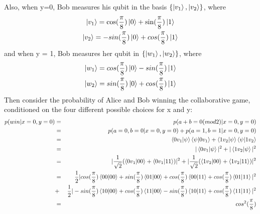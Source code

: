Also, when y=0, Bob measures his qubit in the basis $\{\ket{v_1}, \ket{v_2}\}$, where
\begin{gather*}
    \ket{v_1}=\cos(\frac{\pi}{8})\ket{0}+\sin(\frac{\pi}{8})\ket{1}\\
    \ket{v_2}=-sin(\frac{\pi}{8})\ket{0}+cos(\frac{\pi}{8})\ket{1}  
\end{gather*}
and when y = 1, Bob measures her qubit in $\{\ket{w_1}, \ket{w_2}\}$, where
\begin{gather*}
    \ket{w_1}=cos(\frac{\pi}{8})\ket{0}-sin(\frac{\pi}{8})\ket{1}\\
    \ket{w_2}=sin(\frac{\pi}{8})\ket{0}+cos(\frac{\pi}{8})\ket{1}
    \end{gather*}
Then consider the probability of Alice and Bob winning the collaborative game, conditioned on the four different possible choices for x and y:
\begin{eqnarray*}
p(win|x=0,y=0)&=&p(a+b=0(mod 2)|x=0,y=0)\\
&=&p(a=0, b=0|x=0, y=0)+p(a=1, b=1|x=0, y=0)\\
&=&\braket{0 v_1|\psi}\braket{\psi|0v_1}+\braket{1 v_2|\psi}\braket{\psi|1v_2}\\
&=&|\braket{0 v_1|\psi}|^2 + |\braket{1 v_2|\psi}|^2\\
&=&|\frac{1}{\sqrt{2}}(\braket{0v_1|00}+\braket{0v_1|11})|^2+|\frac{1}{\sqrt{2}}(\braket{1v_2|00}+\braket{1v_2|11})|^2\\
&=&\frac{1}{2}|cos(\frac{\pi}{8})\braket{00|00}+sin(\frac{\pi}{8})\braket{01|00}+cos(\frac{\pi}{8})\braket{00|11}+cos(\frac{\pi}{8})\braket{01|11}|^2\\
&+&\frac{1}{2}|-sin(\frac{\pi}{8})\braket{10|00}+cos(\frac{\pi}{8})\braket{11|00}-sin(\frac{\pi}{8})\braket{10|11}+cos(\frac{\pi}{8})\braket{11|11}|^2\\
&=&cos^2(\frac{\pi}{8})
\end{eqnarray*}

